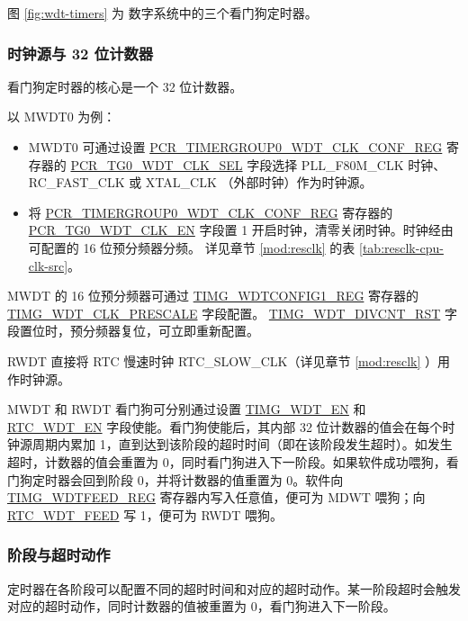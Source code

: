 \documentclass[main\_\_CN.tex]{subfiles}
\begin{document}
图 \ref{fig:wdt-timers} 为 \chipname{} 数字系统中的三个看门狗定时器。

\subsubsection{时钟源与 32 位计数器}
看门狗定时器的核心是一个 32 位计数器。

以 MWDT0 为例：

\begin{itemize}
    \item MWDT0 可通过设置 \hyperref[regdesc:PCRTIMERGROUP0WDTCLKCONFREG]{PCR\_TIMERGROUP0\_WDT\_CLK\_CONF\_REG} 寄存器的 \hyperref[fielddesc:PCRTG0WDTCLKSEL]{PCR\_TG0\_WDT\_CLK\_SEL} 字段选择 PLL\_F80M\_CLK 时钟、RC\_FAST\_CLK 或 XTAL\_CLK （外部时钟）作为时钟源。

    \item 将 \hyperref[regdesc:PCRTIMERGROUP0WDTCLKCONFREG]{PCR\_TIMERGROUP0\_WDT\_CLK\_CONF\_REG} 寄存器的 \hyperref[fielddesc:PCRTG0WDTCLKEN]{PCR\_TG0\_WDT\_CLK\_EN} 字段置 1 开启时钟，清零关闭时钟。时钟经由可配置的 16 位预分频器分频。 详见章节 \ref{mod:resclk} \textit{} 的表 \ref{tab:resclk-cpu-clk-src}。
\end{itemize}

MWDT 的 16 位预分频器可通过 \hyperref[regdesc:TIMGWDTCONFIG1REG]{TIMG\_WDTCONFIG1\_REG} 寄存器的 \hyperref[fielddesc:TIMGWDTCLKPRESCALE]{TIMG\_WDT\_CLK\_PRESCALE} 字段配置。 \hyperref[fielddesc:TIMGWDTDIVCNTRST]{TIMG\_WDT\_DIVCNT\_RST} 字段置位时，预分频器复位，可立即重新配置。


RWDT 直接将 RTC 慢速时钟 RTC\_SLOW\_CLK（详见章节 \ref{mod:resclk} \textit{}）用作时钟源。

MWDT 和 RWDT 看门狗可分别通过设置 \hyperref[fielddesc:TIMGWDTEN]{TIMG\_WDT\_EN} 和 \hyperref[fielddesc:RTCWDTEN]{RTC\_WDT\_EN} 字段使能。看门狗使能后，其内部 32 位计数器的值会在每个时钟源周期内累加 1，直到达到该阶段的超时时间（即在该阶段发生超时）。如发生超时，计数器的值会重置为 0，同时看门狗进入下一阶段。如果软件成功喂狗，看门狗定时器会回到阶段 0，并将计数器的值重置为 0。软件向 \hyperref[regdesc:TIMGWDTFEEDREG]{TIMG\_WDTFEED\_REG} 寄存器内写入任意值，便可为 MDWT  喂狗；向 \hyperref[fielddesc:RTCWDTRTCWDTFEED]{RTC\_WDT\_FEED} 写 1，便可为 RWDT 喂狗。


\subsubsection{阶段与超时动作}\label{sec:wdt-timeout}
定时器在各阶段可以配置不同的超时时间和对应的超时动作。某一阶段超时会触发对应的超时动作，同时计数器的值被重置为 0，看门狗进入下一阶段。
\end{document}
